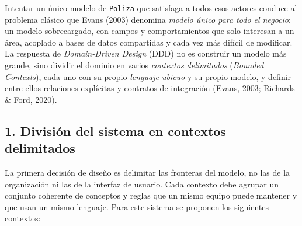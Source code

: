\documentclass[11pt,a4paper]{article}
\begin{document}
Intentar un único modelo de \texttt{Poliza} que satisfaga a todos esos actores conduce al
problema clásico que Evans (2003) denomina \emph{modelo único para todo el negocio}: un
modelo sobrecargado, con campos y comportamientos que solo interesan a un área, acoplado a
bases de datos compartidas y cada vez más difícil de modificar. La respuesta de
\emph{Domain-Driven Design} (DDD) no es construir un modelo más grande, sino dividir el
dominio en varios \emph{contextos delimitados} (\emph{Bounded Contexts}), cada uno con su
propio \emph{lenguaje ubicuo} y su propio modelo, y definir entre ellos relaciones
explícitas y contratos de integración (Evans, 2003; Richards \& Ford, 2020).

\subsection*{1. División del sistema en contextos delimitados}

La primera decisión de diseño es delimitar las fronteras del modelo, no las de la
organización ni las de la interfaz de usuario. Cada contexto debe agrupar un conjunto
coherente de conceptos y reglas que un mismo equipo puede mantener y que usan un mismo
lenguaje. Para este sistema se proponen los siguientes contextos:
\end{document}
